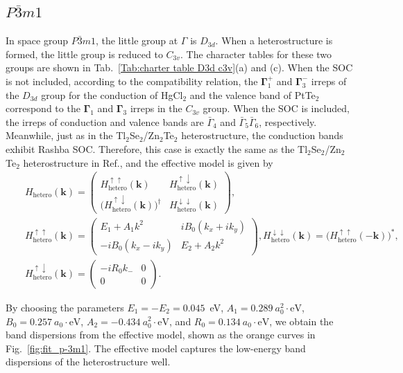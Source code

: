 \documentclass[aps, preprint, prb,]{revtex4-2}
\def\kk{\mathbf{k}}
\begin{document}
\subsection{$P\bar{3}m1$}
In space group $P\bar{3}m1$, the little group at $\Gamma$ is $D_{3d}$. When a heterostructure is formed, the little group is reduced to $C_{3v}$. The character tables for  these two groups are shown in Tab.~\ref{Tab:charter table D3d c3v}(a) and (c). When the SOC is not included, according to the compatibility relation, the $\mathbf{\Gamma}^+_1$ and $\mathbf{\Gamma}^-_3$ irreps of the $D_{3d}$ group for the conduction of HgCl$_2$ and the valence band of PtTe$_2$ correspond to the $\mathbf{\Gamma}_1$ and $\mathbf{\Gamma}_3$ irreps in the $C_{3v}$ group. When the SOC is included,  the irreps of conduction and valence bands are $\bar{\Gamma}_4$ and $\bar{\Gamma}_5\bar{\Gamma}_6$, respectively. Meanwhile, just as in the Tl$_2$Se$_2$/Zn$_2$Te$_2$ heterostructure, the conduction bands exhibit Rashba SOC.  Therefore, this case is exactly the same as the Tl$_2$Se$_2$/Zn$_2$Te$_2$ heterostructure in Ref.\cite{Liu2025IdealTHF}, and the effective model is given by
\begin{eqnarray}
&&H_{\mathrm{hetero}}(\kk)=
\begin{pmatrix}
H^{\uparrow\uparrow}_{\mathrm{hetero}}(\kk) & H^{\uparrow\downarrow}_{\mathrm{hetero}}(\kk) \\
\bigl(H^{\uparrow\downarrow}_{\mathrm{hetero}}(\kk)\bigr)^\dagger & H^{\downarrow\downarrow}_{\mathrm{hetero}}(\kk)
\end{pmatrix},\nonumber\\
&&H^{\uparrow\uparrow}_{\mathrm{hetero}}(\kk)=
\begin{pmatrix}
E_1 + A_1 k^2 & i B_0 (k_x + i k_y) \nonumber \\
- i B_0 (k_x - i k_y) & E_2 + A_2 k^2
\end{pmatrix}, H^{\downarrow\downarrow}_{\mathrm{hetero}}(\kk)=
\bigl(H^{\uparrow\uparrow}_{\mathrm{hetero}}(-\kk)\bigr)^*, \\
&&H^{\uparrow\downarrow}_{\mathrm{hetero}}(\kk)=
\begin{pmatrix}
- i R_0 k_- & 0 \\
0 & 0
\end{pmatrix}. \label{Eq;Rashba}
\end{eqnarray}

 By choosing the parameters $E_1=-E_2=0.045$~eV, $A_1=0.289~a_0^2\!\cdot\!\mathrm{eV}$, $B_0=0.257~a_0\!\cdot\!\mathrm{eV}$, $A_2=-0.434~a_0^2\!\cdot\!\mathrm{eV}$, and $R_0=0.134~a_0\!\cdot\!\mathrm{eV}$, we obtain the band dispersions from the effective model, shown as the orange curves in Fig.~\ref{fig:fit_p-3m1}. The effective model captures the low-energy band dispersions of the heterostructure well. 
\end{document}
